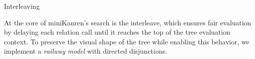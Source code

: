 \documentclass[final]{beamer}
\newlength{\colwidth}
\begin{document}
\begin{frame}[t]
\begin{columns}[t]
\begin{column}{\colwidth}
  \begin{block}{Interleaving}

At the core of miniKanren's search is the interleave, which ensures fair evaluation by delaying each relation call until it reaches the top of the tree evaluation context. To preserve the visual shape of the tree while enabling this behavior, we implement a \textit{railway model} with directed disjunctions.

\centering
\begin{figure}[htbp]
\vspace{-1cm}
\end{figure}
\end{block}
\end{column}
\end{columns}
\end{frame}
\end{document}
